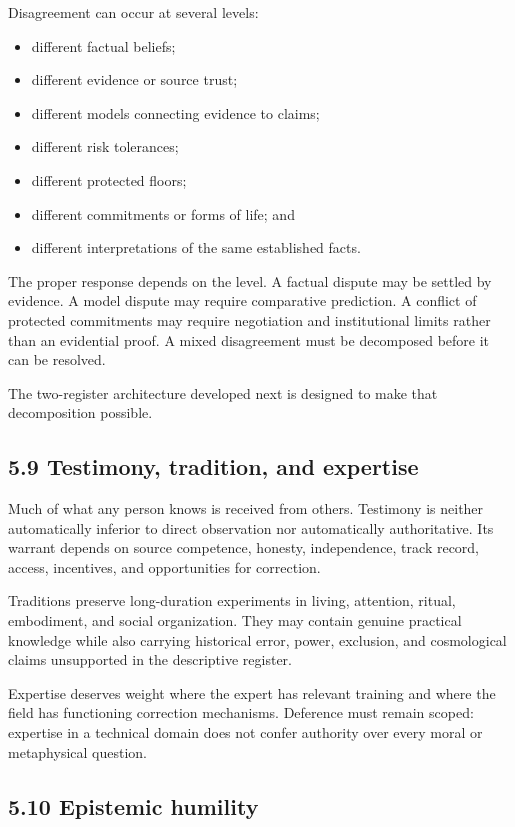 \documentclass[
  11pt,
]{article}
\providecommand{\tightlist}{%
  \setlength{\itemsep}{0pt}\setlength{\parskip}{0pt}}
\begin{document}
Disagreement can occur at several levels:

\begin{itemize}
\tightlist
\item
  different factual beliefs;
\item
  different evidence or source trust;
\item
  different models connecting evidence to claims;
\item
  different risk tolerances;
\item
  different protected floors;
\item
  different commitments or forms of life; and
\item
  different interpretations of the same established facts.
\end{itemize}

The proper response depends on the level. A factual dispute may be
settled by evidence. A model dispute may require comparative prediction.
A conflict of protected commitments may require negotiation and
institutional limits rather than an evidential proof. A mixed
disagreement must be decomposed before it can be resolved.

The two-register architecture developed next is designed to make that
decomposition possible.

\subsection{5.9 Testimony, tradition, and
expertise}\label{testimony-tradition-and-expertise}

Much of what any person knows is received from others. Testimony is
neither automatically inferior to direct observation nor automatically
authoritative. Its warrant depends on source competence, honesty,
independence, track record, access, incentives, and opportunities for
correction.

Traditions preserve long-duration experiments in living, attention,
ritual, embodiment, and social organization. They may contain genuine
practical knowledge while also carrying historical error, power,
exclusion, and cosmological claims unsupported in the descriptive
register.

Expertise deserves weight where the expert has relevant training and
where the field has functioning correction mechanisms. Deference must
remain scoped: expertise in a technical domain does not confer authority
over every moral or metaphysical question.

\subsection{5.10 Epistemic humility}\label{epistemic-humility}
\end{document}
